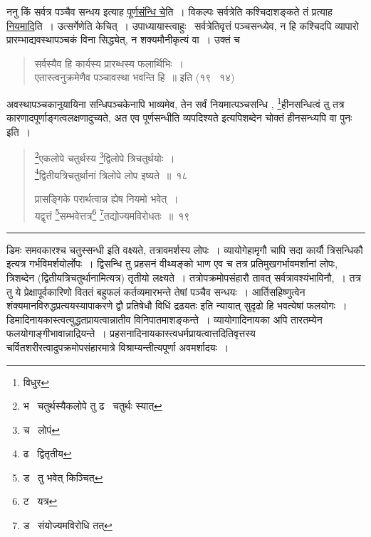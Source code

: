 \documentclass[11pt, openany]{book}
\begin{document}
ननु किं सर्वत्र पञ्चैव सन्धय इत्याह \underline{पूर्णसंन्धि चे}ति~। विकल्पः सर्वत्रेति कश्चिदाशङ्कते तं प्रत्याह \underline{नियमादि}ति~। उत्सर्गेणेति केचित्~। उपाध्यायास्त्वाहुः \textendash\ सर्वत्रेतिवृत्तं पञ्चसन्ध्येव, न हि कश्चिदपि व्यापारो प्रारम्भाद्यवस्थापञ्चकं विना सिद्ध्येत्, न शक्यमौनीकृत्यं वा~। उक्तं च \textendash\ 

\begin{quote}
{\qt सर्वस्यैव हि कार्यस्य प्रारब्धस्य फलार्थिभिः~।\\
एतास्त्वनुक्रमेणैव पञ्चावस्था भवन्ति हि~॥} इति (१९ \textendash\ १४)
\end{quote}

\noindent
अवस्थापञ्चकानुयायिना सन्धिपञ्चकेनापि भाव्यमेव, तेन सर्वं नियमात्पञ्चसन्धि , \renewcommand{\thefootnote}{1}\footnote{विधुर}हीनसन्धित्वं तु तत्र कारणादपूर्णाङ्गत्वलक्षणादुच्यते, अत एव पूर्णसन्धीति व्यपदिश्यते इत्यपिशब्देन चोक्तं {\qt हीनसन्ध्यपि वा पुनः } इति~।

\newpage

\begin{quote}
{\na \renewcommand{\thefootnote}{1}\footnote{भ \textendash\ चतुर्थस्यैकलोपे तु ढ \textendash\ चतुर्थः स्यात्}एकलोपे चतुर्थस्य \renewcommand{\thefootnote}{2}\footnote{च \textendash\ लोपं}द्विलोपे त्रिचतुर्थयोः~।\\
\renewcommand{\thefootnote}{3}\footnote{ढ \textendash\ द्वितृतीय}द्वितीयत्रिचतुर्थानां त्रिलोपे लोप इष्यते~॥~१८

प्रासङ्गिके परार्थत्वान्न ह्येष नियमो भवेत्~।\\
यद्वृत्तं \renewcommand{\thefootnote}{4}\footnote{ड \textendash\ तु भवेत् किञ्चित्}सम्भवेत्तत्र\renewcommand{\thefootnote}{5}\footnote{ट \textendash\ यत्र} \renewcommand{\thefootnote}{6}\footnote{ड \textendash\ संयोज्यमविरोधि तत्}तद्योज्यमविरोधतः~॥~१९}
\end{quote}

\hrule

\vspace{2mm}
\noindent
{\qt डिमः समवकारश्च चतुस्सन्धी} इति वक्ष्यते, तत्रावमर्शस्य लोपः~। {\qt व्यायोगेहामृगौ चापि सदा कार्यौ त्रिसन्धिकौ} इत्यत्र गर्भविमर्शयोर्लोपः~। {\qt द्विसन्धि तु प्रहसनं वीथ्यङ्को भाण एव च} तत्र प्रतिमुखगर्भावमर्शानां लोपः, त्रिशब्देन (द्वितीयत्रिचतुर्थानामित्यत्र) तृतीयो लक्ष्यते~। तत्रोपक्रमोपसंहारौ तावत् सर्वत्रावश्यंभाविनौ,~। तत्र तु ये प्रेक्षापूर्वकारिणो विततं बहुफलं कर्तव्यमारभन्ते तेषां पञ्चैव सन्धयः~। आर्तिसहिष्णुत्वेन शंक्यमानविरुद्धप्रत्ययस्यापाकरणे {\qt द्वौ प्रतिषेधौ विधिं द्रढयतः} इति न्यायात् सुदृढो हि भवत्येषां फलयोगः~। डिमादिनायकास्त्वत्युद्धतप्रायत्वान्नातीव विनिपातमाशङ्कन्ते~। व्यायोगादिनायका अपि तारतम्येन फलयोगाङ्गीभावान्नाद्रियन्ते~। प्रहसनादिनायकास्त्वधर्मप्रायत्वात्तदितिवृत्तस्य चर्वितशरीरत्वादुपक्रमोपसंहारमात्रे विश्राम्यन्तीत्यपूर्णा अवमर्शादयः~।\\
\end{document}
